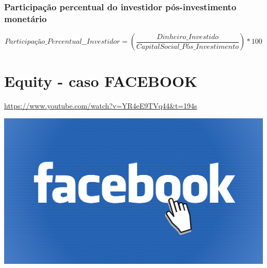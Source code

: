\documentclass[
]{book}
\begin{document}
\subsubsection{Participação percentual do investidor pós-investimento monetário}\label{participauxe7uxe3o-percentual-do-investidor-puxf3s-investimento-monetuxe1rio}

\[
Participação\_Percentual\_\_Investidor = (\frac{ Dinheiro\_Investido}{ CapitalSocial\_Pós\_Investimento}) * 100%
\]

\section{Equity - caso FACEBOOK}\label{equity---caso-facebook}

\url{https://www.youtube.com/watch?v=YR4eE9TVq44&t=194s}

\includegraphics[width=7.04167in,height=\textheight]{images/03-2025-08-19_20/05-facebook.png}
\end{document}
